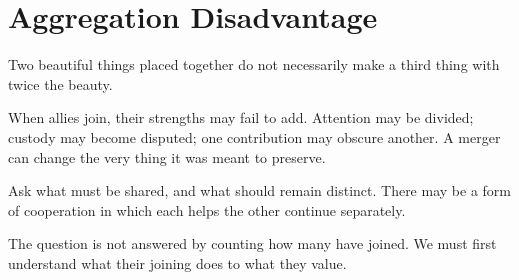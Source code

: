 \chapter{Aggregation Disadvantage}
\label{short:aggregation-disadvantage}

Two beautiful things placed together do not necessarily make a third thing
with twice the beauty.

When allies join, their strengths may fail to add. Attention may be divided;
custody may become disputed; one contribution may obscure another. A merger
can change the very thing it was meant to preserve.

Ask what must be shared, and what should remain distinct. There may be a form
of cooperation in which each helps the other continue separately.

The question is not answered by counting how many have joined. We must first
understand what their joining does to what they value.

